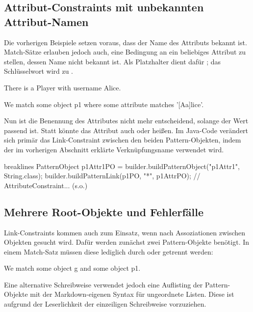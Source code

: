 \subsection{Attribut-Constraints mit unbekannten Attribut-Namen}

Die vorherigen Beispiele setzen voraus, dass der Name des Attributs bekannt ist.
Match-Sätze erlauben jedoch auch, eine Bedingung an ein beliebiges Attribut zu stellen, dessen Name nicht bekannt ist.
Als Platzhalter dient dafür ;
das Schlüsselwort  wird zu .

\begin{mdcodeblock}
    There is a Player with username Alice.

    We match some object p1 where some attribute matches '[Aa]lice'.
\end{mdcodeblock}

Nun ist die Benennung des Attributes nicht mehr entscheidend, solange der Wert passend ist.
Statt  könnte das Attribut auch  oder  heißen.
Im Java-Code verändert sich primär das Link-Constraint zwischen den beiden Pattern-Objekten, indem der im vorherigen Abschnitt erklärte Verknüpfungsname \code{*} verwendet wird.

\begin{jcodeblock*}{breaklines}
    PatternObject p1Attr1PO = builder.buildPatternObject("p1Attr1", String.class);
    builder.buildPatternLink(p1PO, "*", p1AttrPO);
    // AttributeConstraint... (s.o.)
\end{jcodeblock*}

\subsection{Mehrere Root-Objekte und Fehlerfälle}

Link-Constraints kommen auch zum Einsatz, wenn nach Assoziationen zwischen Objekten gesucht wird.
Dafür werden zunächst zwei Pattern-Objekte benötigt.
In einem Match-Satz müssen diese lediglich durch  oder \code{,} getrennt werden:

\begin{mdcodeblock}
    We match some object g and some object p1.
\end{mdcodeblock}

Eine alternative Schreibweise verwendet jedoch eine Auflisting der Pattern-Objekte mit der Markdown-eigenen Syntax für ungeordnete Listen.
Diese ist aufgrund der Leserlichkeit der einzeiligen Schreibweise vorzuziehen.

